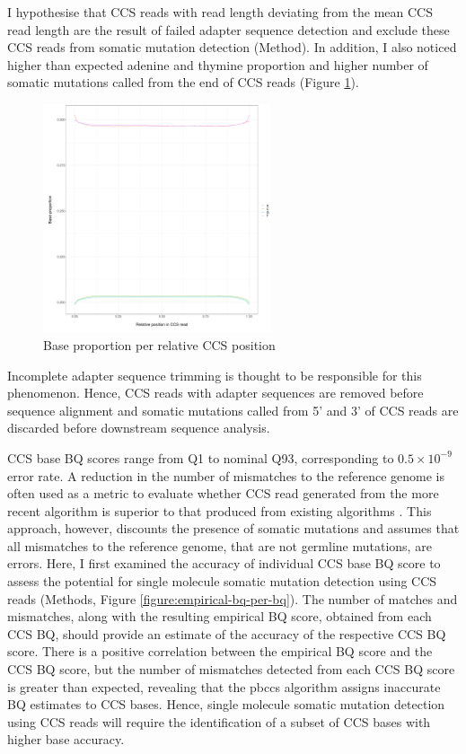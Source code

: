 I hypothesise that CCS reads with read length deviating from the mean CCS read length are the result of failed adapter sequence detection and exclude these CCS reads from somatic mutation detection (Method). In addition, I also noticed higher than expected adenine and thymine proportion and higher number of somatic mutations called from the end of CCS reads (Figure \ref{figure:base-proportion-per-ccs-position}). 

\begin{figure}[h!]
\caption{Base proportion per relative CCS position}
\label{figure:base-proportion-per-ccs-position}
\begin{centering}
\includegraphics[width=0.6\textwidth]{Vector/base_proportion_per_ccs_position.pdf}
\end{centering}
\end{figure}

Incomplete adapter sequence trimming is thought to be responsible for this phenomenon. Hence, CCS reads with adapter sequences are removed before sequence alignment and somatic mutations called from 5’ and 3’ of CCS reads are discarded before downstream sequence analysis. 

CCS base BQ scores range from Q1 to nominal Q93, corresponding to $0.5\times10^{-9}$ error rate. A reduction in the number of mismatches to the reference genome is often used as a metric to evaluate whether CCS read generated from the more recent algorithm is superior to that produced from existing algorithms \cite{Wenger2019-pw, Baid2022-or}. This approach, however, discounts the presence of somatic mutations and assumes that all mismatches to the reference genome, that are not germline mutations, are errors. Here, I first examined the accuracy of individual CCS base BQ score to assess the potential for single molecule somatic mutation detection using CCS reads (Methods, Figure \ref{figure:empirical-bq-per-bq}). The number of matches and mismatches, along with the resulting empirical BQ score, obtained from each CCS BQ, should provide an estimate of the accuracy of the respective CCS BQ score. There is a positive correlation between the empirical BQ score and the CCS BQ score, but the number of mismatches detected from each CCS BQ score is greater than expected, revealing that the pbccs algorithm assigns inaccurate BQ estimates to CCS bases. Hence, single molecule somatic mutation detection using CCS reads will require the identification of a subset of CCS bases with higher base accuracy.

